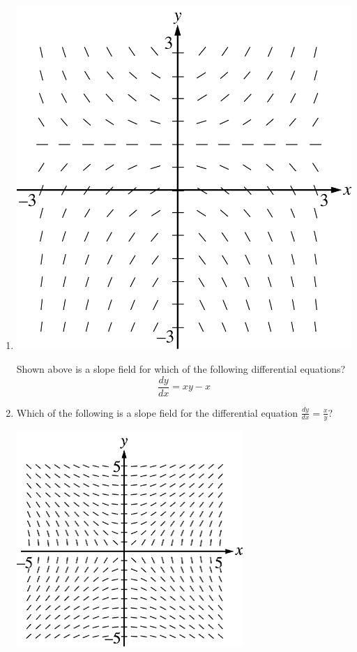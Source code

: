 \documentclass[12pt]{article}
\begin{document}
\begin{enumerate}
\item 
\begin{center}
        \includegraphics[scale=1]{original-2.png}
    \end{center}
Shown above is a slope field for which of the following differential equations?
$$\boxed{\frac{dy}{dx}=xy-x}$$

\item Which of the following is a slope field for the differential equation $\frac{dy}{dx}=\frac{x}{y}$?
\begin{center}
\includegraphics[]{original-3.png}
\end{center}


\end{enumerate}
\end{document}
